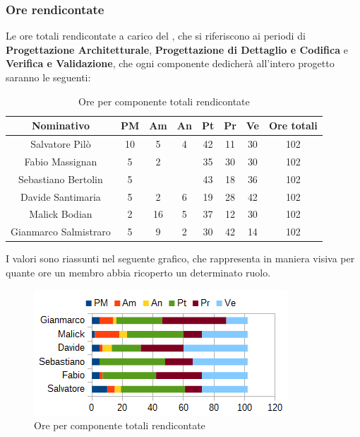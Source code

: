 		\subsubsection{Ore rendicontate}
		Le ore totali rendicontate a carico del , che si riferiscono ai periodi di \textbf{Progettazione Architetturale}, \textbf{Progettazione di Dettaglio e Codifica} e \textbf{Verifica e Validazione}, che ogni componente dedicherà all'intero progetto saranno le seguenti: \\
		\begin{table}[H]
		\centering
		\begin{tabular}{|c|c|c|c|c|c|c|c|}
			\hline
			\textbf{Nominativo}		& \textbf{PM}	& \textbf{Am}	& \textbf{An}	& \textbf{Pt}	& \textbf{Pr}	& \textbf{Ve}	& \textbf{Ore totali}     \\
			\hline
			Salvatore Pilò			& 10	& 5		& 4		& 42	& 11	& 30	& 102 \\
			Fabio Massignan			& 5		& 2		& 		& 35	& 30	& 30	& 102 \\
			Sebastiano Bertolin		& 5		& 		& 		& 43	& 18	& 36	& 102 \\
			Davide Santimaria		& 5		& 2		& 6		& 19	& 28	& 42	& 102 \\
			Malick Bodian			& 2		& 16	& 5		& 37	& 12	& 30	& 102 \\
			Gianmarco Salmistraro	& 5		& 9		& 2		& 30	& 42	& 14	& 102 \\
			\hline
		\end{tabular}
		\caption{Ore per componente totali rendicontate}
		\end{table}
		I valori sono riassunti nel seguente grafico, che rappresenta in maniera visiva per quante ore un membro abbia ricoperto un determinato ruolo. \\
		\begin{figure}[H]
			\centering
			\includegraphics[scale=1]{immagini/grafici/orario_rendicontato-barra.png}
			\caption{Ore per componente totali rendicontate}
		\end{figure}